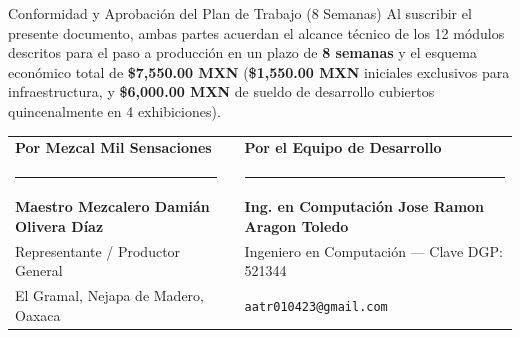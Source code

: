 \documentclass[11pt,letterpaper]{article}
\begin{document}
\vspace{0.2cm}
\begin{goldbox}{Conformidad y Aprobación del Plan de Trabajo (8 Semanas)}
Al suscribir el presente documento, ambas partes acuerdan el alcance técnico de los 12 módulos descritos para el paso a producción en un plazo de \textbf{8 semanas} y el esquema económico total de \textbf{\$7,550.00 MXN} (\textbf{\$1,550.00 MXN} iniciales exclusivos para infraestructura, y \textbf{\$6,000.00 MXN} de sueldo de desarrollo cubiertos quincenalmente en 4 exhibiciones).
\end{goldbox}

\vspace{0.5cm}

\noindent
\begin{tabularx}{\textwidth}{>{\centering\arraybackslash}X p{1cm} >{\centering\arraybackslash}X}
    \textbf{Por Mezcal Mil Sensaciones} & & \textbf{Por el Equipo de Desarrollo} \\[1.2cm]
    \rule{6.2cm}{0.8pt} & & \rule{6.2cm}{0.8pt} \\
    \textbf{Maestro Mezcalero Damián Olivera Díaz} & & \textbf{Ing. en Computación Jose Ramon Aragon Toledo} \\
    Representante / Productor General & & Ingeniero en Computación — Clave DGP: 521344 \\
    El Gramal, Nejapa de Madero, Oaxaca & & \texttt{aatr010423@gmail.com}
\end{tabularx}
\end{document}
